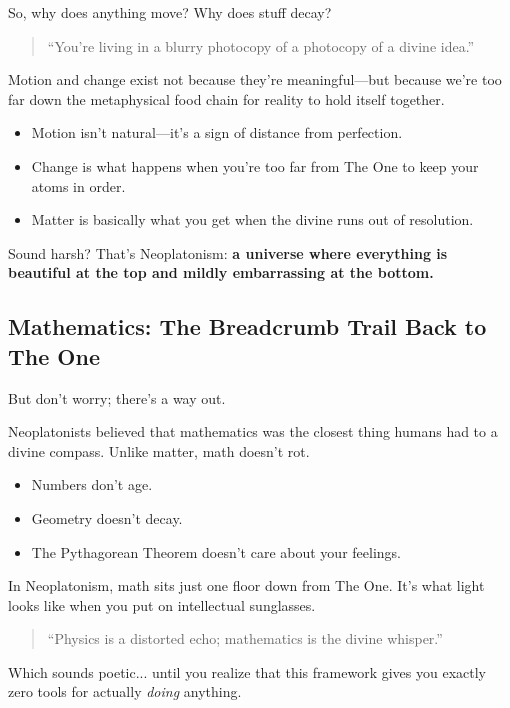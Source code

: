 So, why does anything move? Why does stuff decay?

\begin{quote}
    “You're living in a blurry photocopy of a photocopy of a divine idea.”
\end{quote}

Motion and change exist not because they’re meaningful—but because we’re too far down the metaphysical food chain for reality to hold itself together.

\begin{itemize}
    \item Motion isn’t natural—it’s a sign of distance from perfection.
    \item Change is what happens when you’re too far from The One to keep your atoms in order.
    \item Matter is basically what you get when the divine runs out of resolution.
\end{itemize}

Sound harsh? That’s Neoplatonism: \textbf{a universe where everything is beautiful at the top and mildly embarrassing at the bottom.}

\subsection{Mathematics: The Breadcrumb Trail Back to The One}

But don’t worry; there’s a way out.

Neoplatonists believed that mathematics was the closest thing humans had to a divine compass. Unlike matter, math doesn’t rot.

\begin{itemize}
    \item Numbers don’t age.
    \item Geometry doesn’t decay.
    \item The Pythagorean Theorem doesn’t care about your feelings.
\end{itemize}

In Neoplatonism, math sits just one floor down from The One. It’s what light looks like when you put on intellectual sunglasses.

\begin{quote}
    “Physics is a distorted echo; mathematics is the divine whisper.”
\end{quote}

Which sounds poetic... until you realize that this framework gives you exactly zero tools for actually \emph{doing} anything.

